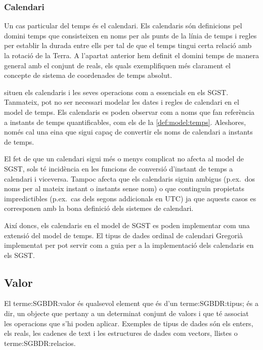 \subsubsection{Calendari}

Un cas particular del temps és el calendari. Els calendaris són
definicions pel domini temps que consisteixen en noms per als punts de
la línia de temps i regles per establir la durada entre ells per tal
de que el temps tingui certa relació amb la rotació de la Terra. A
l'apartat anterior hem definit el domini temps de manera general
amb el conjunt de reals, els quals exemplifiquen més clarament el
concepte de sistema de coordenades de temps absolut.

\textcite{dreyer94} situen els calendaris i les seves operacions com a
essencials en els SGST. Tanmateix, pot no ser necessari modelar les
dates i regles de calendari en el model de temps. Els calendaris es
poden observar com a noms que fan referència a instants de temps
quantificables, com els de la \autoref{def:model:temps}. Aleshores,
només cal una eina que sigui capaç de convertir els noms de calendari
a instants de temps.

El fet de que un calendari sigui més o menys complicat no afecta al
model de SGST, sols té incidència en les funcions de conversió
d'instant de temps a calendari i viceversa. Tampoc afecta que els
calendaris siguin ambigus (p.ex.\ dos noms per al mateix instant o
instants sense nom) o que continguin propietats impredictibles (p.ex.\
cas dels segons addicionals en UTC) ja que aquests casos es
corresponen amb la bona definició dels sistemes de calendari.

Així doncs, els calendaris en el model de SGST es poden implementar
com una extensió del model de temps. El tipus de dades ordinal de
calendari Gregorià implementat per
\textcite[cap.~16]{date02:_tempor_data_relat_model} pot servir com a
guia per a la implementació dels calendaris en els SGST.




\subsection{Valor}
\label{sec:sgst:valor}


El \gls{terme:SGBDR:valor} és qualsevol element que és d'un
\gls{terme:SGBDR:tipus}; és a dir, un objecte que
pertany a un determinat conjunt de valors i que té associat les
operacions que s'hi poden aplicar. Exemples de tipus de dades són els
enters, els reals, les cadenes de text i les estructures de dades com
vectors, llistes o \glspl{terme:SGBDR:relacio}.  

